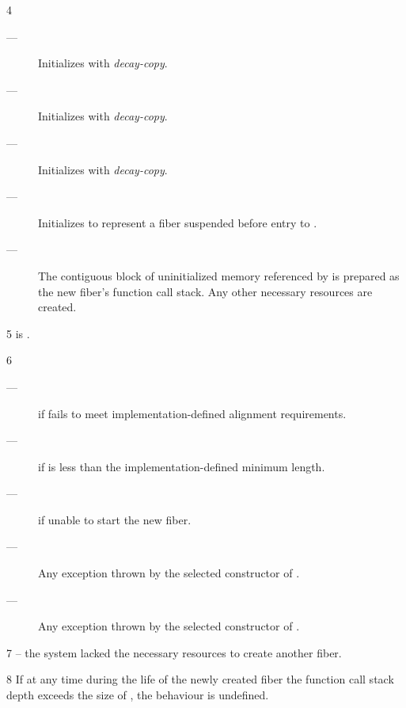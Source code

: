4 \effects
\begin{description}
    \item[---] Initializes  with \emph{decay-copy}.
    \item[---] Initializes  with \emph{decay-copy}.
    \item[---] Initializes  with \emph{decay-copy}.
    \item[---] Initializes  to represent a fiber suspended before
              entry to .
    \item[---] The contiguous block of uninitialized memory referenced
              by  is prepared as the new fiber's function call stack.
              Any other necessary resources are created.
\end{description}

5 \postcond
\emptyfn is \false.

6 \except
\begin{description}
    \item[---]  if  fails to meet
               implementation-defined alignment requirements.
    \item[---]  if  is less than the
               implementation-defined minimum length.
    \item[---]  if unable to start the new fiber.
    \item[---] Any exception thrown by the selected constructor of .
    \item[---] Any exception thrown by the selected constructor of .
\end{description}

7 \errors
{} -- the system lacked the necessary resources to create another fiber.

8 \remarks
If at any time during the life of the newly created fiber the
function call stack depth exceeds the size of , the behaviour is
undefined.

